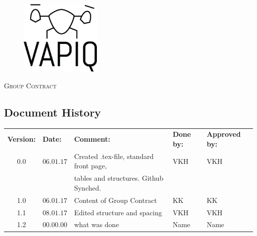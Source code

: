 \documentclass{article}
\author{Tomas Lyngroth \\ Aleksander Holthe \\ Vanja Katinka Halvorsen \\ Stian Fredriksen \\ Kent Kjeldaas \\ Katrine Sundal Haune}
\makeatletter
\let\vapiqteam\@author
\makeatother
\begin{document}
\begin{titlepage}
    \centering
    \pagecolor{gainsboro}
	\\[3.0 cm]
    \begin{figure}[h]
        \centering
        \includegraphics[width = 0.35\textwidth]{VAPIQ-PICTURES//Logo2_Tilted.png}
    \\[2.0 cm]
    \end{figure}                        
    \textsc{\Huge Group Contract}       
    \\[4.0 cm]
	\large \vapiqteam      
\end{titlepage}
\pagecolor{white}


\newpage
\begin{center}
\vspace*{1 cm}
\section*{\textbf{Document History}}
\begin{tabular}{cllll}
\rowcolor{cadetgrey}
\textbf{Version:}    &\textbf{Date:} 	 &\textbf{Comment:}    &\textbf{Done by:}   &\textbf{Approved by:}  \\

0.0       & $06.01.17$   & Created .tex-file, standard front page, & VKH  & VKH \\
          &              & tables and structures. Github Synched.    &     & \\\rowcolor{gainsboro}
1.0       & $06.01.17$   & Content of Group Contract  & KK    & KK          \\
1.1       & $08.01.17$   & Edited structure and spacing & VKH    & VKH          \\ \rowcolor{gainsboro}
1.2       & $00.00.00$   & what was done  & Name    & Name          \\
\end{tabular}                                                                   
\end{center}
\end{document}
